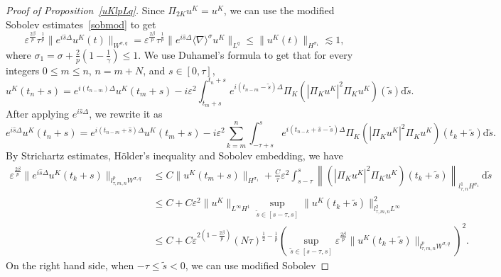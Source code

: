 \documentclass[10pt,a4paper]{article}
\begin{document}
  \begin{proof}[Proof of Proposition~\ref{uKlpLq}]
    Since \(\Pi_{2K} u^K = u^K\), we can use the modified Sobolev
    estimates~\eqref{sobmod} to get 
    \begin{equation}\label{l0usq}
      \varepsilon^{\frac{2\beta}p}\tau^\frac1p \|e^{i\hat s\Delta}u^K(t)\|_{W^{\sigma,q}} = 
      \varepsilon^{\frac{2\beta}p} \tau^\frac1p \|e^{i\hat s\Delta}\langle\nabla\rangle^\sigma u^K\|_{L^q}
      \leq \|u^K(t)\|_{H^{\sigma_1}} \lesssim 1,
    \end{equation}
    where \(\sigma_1 = \sigma + \frac2p(1-\frac1\gamma) \leq 1\). We use
    Duhamel's formula to get that for every integers \(0 \leq m \leq n \), 
    \(n = m + N\), and \(s \in [0, \tau]\), 
    \[ u^K(t_n+s) = e^{i(t_{n-m})\Delta} u^K(t_m+s) - i\varepsilon^2 
    \int_{t_m+s}^{t_n+s} e^{i(t_{n-m}-\tilde{s})\Delta}\Pi_K
    \left(|\Pi_K u^K|^2 \Pi_K u^K\right) (\tilde{s}) \mathrm{d} \tilde{s}. \]
    After applying \(e^{i\hat s\Delta}\), we rewrite it as 
    \begin{equation}\label{Duhamel}
      e^{i\hat s\Delta}u^K(t_n+s) = e^{i(t_{n-m}+\hat{s})\Delta} u^K(t_m+s) - i\varepsilon^2 
      \sum_{k=m}^{n} \int_{-\tau+s}^{s} e^{i(t_{n-k}+\hat{s}-\tilde{s})\Delta}\Pi_K
      \left(|\Pi_K u^K|^2 \Pi_K u^K\right) (t_k+\tilde{s}) \mathrm{d} \tilde{s}.
    \end{equation}
    By Strichartz estimates, H\"older's inequality and Sobolev embedding, we have 
    \begin{equation}\label{ulpWsq1}
      \begin{aligned}
        \varepsilon^{\frac{2\beta}p}\|e^{i\hat s\Delta}u^K(t_k+s)\|_{l^p_{\tau,m,n}W^{\sigma,q}} 
        & \leq C \|u^K(t_m+s)\|_{H^{\sigma_1}} + \frac{C}\tau
        \varepsilon^2 \int_{s-\tau}^s \left\|\left(|\Pi_K u^K|^2 \Pi_K u^K\right) 
        (t_k+\tilde{s})\right\|_{l^1_{\tau,n}H^{\sigma_1}}\,\mathrm{d}\tilde{s} \\
        & \leq C + C \varepsilon^2 \|u^K\|_{L^\infty H^1} \sup_{\tilde{s} \in [s-\tau,s]} 
        \|u^K(t_k+\tilde{s})\|_{l^2_{\tau,m,n}L^\infty}^2  \\
        & \leq C + C \varepsilon^{2(1-\frac{2\beta}p)} (N\tau)^{\frac12-\frac1p}
        \left( \sup_{\tilde{s} \in [s-\tau,s]} \varepsilon^{\frac{2\beta}p}
        \|u^K(t_k+\tilde{s})\|_{l^p_{\tau,m,n}W^{\sigma,q}}\right)^2.
      \end{aligned}
    \end{equation}
    On the right hand side, when \(-\tau \leq \tilde s<0\), we can use modified Sobolev 

\end{proof}
\end{document}
